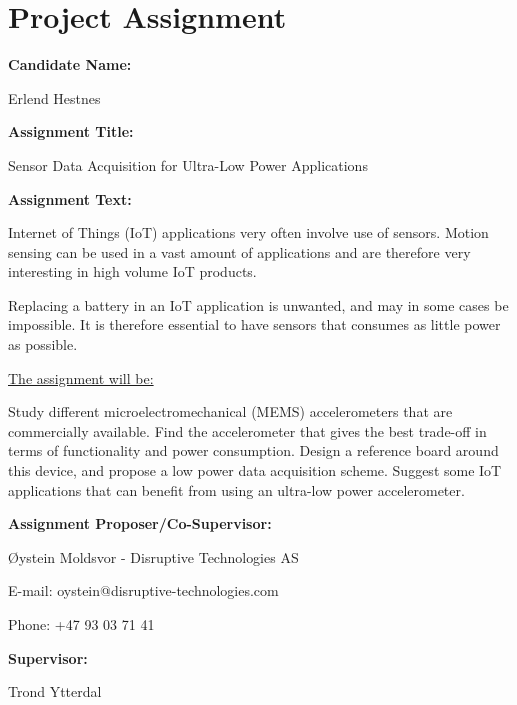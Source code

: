 \section*{Project Assignment}

\textbf{Candidate Name:} 

Erlend Hestnes

\textbf{Assignment Title:} 

Sensor Data Acquisition for Ultra-Low Power Applications

\textbf{Assignment Text:}
 
Internet of Things (IoT) applications very often involve use of sensors. Motion sensing can be used in a vast amount of applications and are therefore very interesting in high volume IoT products.
 
Replacing a battery in an IoT application is unwanted, and may in some cases be impossible. It is therefore essential to have sensors that consumes as little power as possible.

\underline{The assignment will be:}

Study different microelectromechanical (MEMS) accelerometers that are commercially available. Find the accelerometer that gives the best trade-off in terms of functionality and power consumption. Design a reference board around this device, and propose a low power data acquisition scheme. Suggest some IoT applications that can benefit from using an ultra-low power accelerometer.

\textbf{Assignment Proposer/Co-Supervisor:} 

Øystein Moldsvor - Disruptive Technologies AS

E-mail: oystein@disruptive-technologies.com

Phone: +47 93 03 71 41

\textbf{Supervisor:} 

Trond Ytterdal


